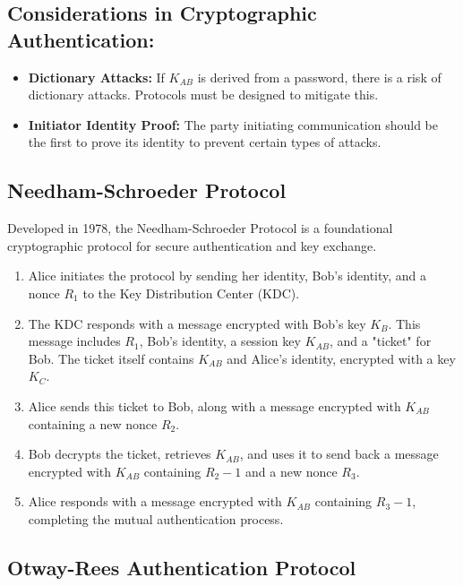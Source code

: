 \documentclass[12pt]{article}
\begin{document}
\subsection*{Considerations in Cryptographic Authentication:}
\begin{itemize}
    \item \textbf{Dictionary Attacks:} If \( K_{AB} \) is derived from a password, there is a risk of dictionary attacks. Protocols must be designed to mitigate this.
    \item \textbf{Initiator Identity Proof:} The party initiating communication should be the first to prove its identity to prevent certain types of attacks.
\end{itemize}

\subsection*{Needham-Schroeder Protocol}

Developed in 1978, the Needham-Schroeder Protocol is a foundational cryptographic protocol for secure authentication and key exchange.

\begin{enumerate}
    \item Alice initiates the protocol by sending her identity, Bob's identity, and a nonce \( R_1 \) to the Key Distribution Center (KDC).
    \item The KDC responds with a message encrypted with Bob's key \( K_B \). This message includes \( R_1 \), Bob's identity, a session key \( K_{AB} \), and a "ticket" for Bob. The ticket itself contains \( K_{AB} \) and Alice's identity, encrypted with a key \( K_C \).
    \item Alice sends this ticket to Bob, along with a message encrypted with \( K_{AB} \) containing a new nonce \( R_2 \).
    \item Bob decrypts the ticket, retrieves \( K_{AB} \), and uses it to send back a message encrypted with \( K_{AB} \) containing \( R_2 - 1 \) and a new nonce \( R_3 \).
    \item Alice responds with a message encrypted with \( K_{AB} \) containing \( R_3 - 1 \), completing the mutual authentication process.
\end{enumerate}

\subsection*{Otway-Rees Authentication Protocol}
\end{document}

